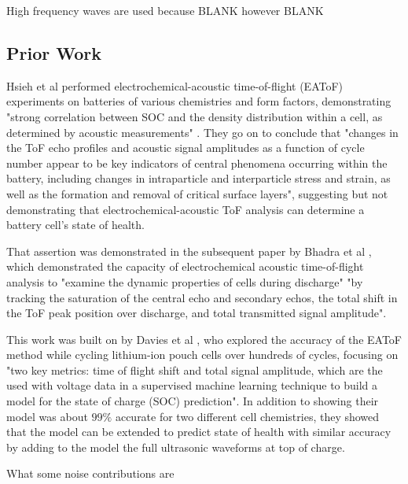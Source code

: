 High frequency waves are used because BLANK however BLANK

\subsection{Prior Work}

Hsieh et al  performed electrochemical-acoustic time-of-flight (EAToF) experiments on batteries of various chemistries and form factors, demonstrating "strong correlation between SOC and the density distribution within a cell, as determined by acoustic measurements" \cite{TOF-STATE}. They go on to conclude that "changes in the ToF echo profiles and acoustic signal amplitudes as a function of cycle number appear to be key indicators of central phenomena occurring within the battery, including changes in intraparticle and interparticle stress and strain, as well as the formation and removal of critical surface layers", suggesting but not demonstrating that electrochemical-acoustic ToF analysis can determine a battery cell's state of health.

That assertion was demonstrated in the subsequent paper by Bhadra et al  \cite{ANODE-CHAR}, which demonstrated the capacity of electrochemical acoustic time-of-flight analysis to "examine the dynamic properties of cells during discharge" "by tracking the saturation of the central echo and secondary echos, the total shift in the ToF peak position over discharge, and total transmitted signal amplitude".

This work was built on by Davies et al  \cite{SOC-SOH-EST}, who explored the accuracy of the EAToF method while cycling lithium-ion pouch cells over hundreds of cycles, focusing on "two key metrics: time of flight shift and total signal amplitude, which are the used with voltage data in a supervised machine learning technique to build a model for the state of charge (SOC) prediction". 
In addition to showing their model was about $99\%$ accurate for two different cell chemistries, they showed that the model can be extended to predict state of health with similar accuracy by adding to the model the full ultrasonic waveforms at top of charge.

What some noise contributions are